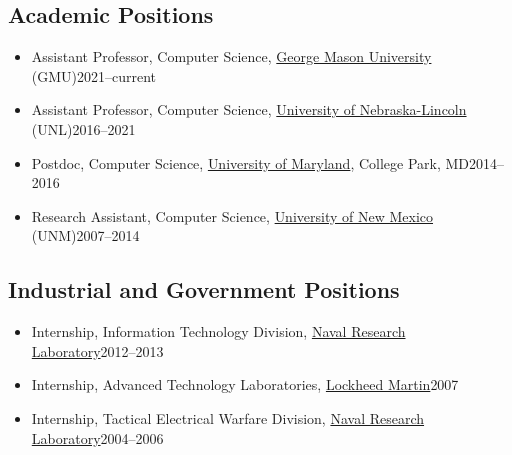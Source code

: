 \documentclass[11pt]{article}
\begin{document}
\subsection{Academic Positions}

\begin{itemize}
    
\item Assistant Professor, Computer Science, \href{https://cs.gmu.edu}{George Mason University} (GMU)\hfill 2021--current
  
\item Assistant Professor, Computer Science, \href{https://computing.unl.edu}{University of Nebraska-Lincoln} (UNL)\hfill 2016--2021

\item Postdoc, Computer Science,  \href{https://www.umd.edu}{University of Maryland}, College Park, MD\hfill 2014--2016
  
\item Research Assistant, Computer Science, \href{https://www.cs.unm.edu}{University of New Mexico} (UNM)\hfill 2007--2014

\end{itemize}

\subsection{Industrial and Government Positions}
\begin{itemize}
\item Internship, Information Technology Division, \href{https://www.nrl.navy.mil}{Naval Research Laboratory}\hfill 2012--2013
\item Internship, Advanced Technology Laboratories, \href{https://lockheedmartin.com/en-us/capabilities/research-labs/advanced-technology-labs.html}{Lockheed Martin}\hfill 2007
\item Internship, Tactical Electrical Warfare Division,  \href{https://www.nrl.navy.mil}{Naval Research Laboratory}\hfill 2004--2006
\end{itemize}
\end{document}
